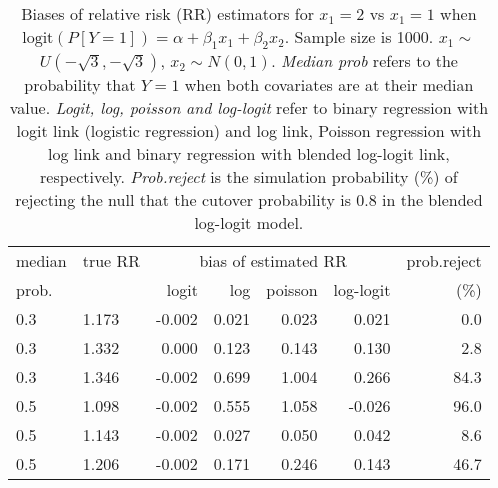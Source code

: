 \documentclass[12pt,a4paper]{article}
\begin{document}
\begin{table}[H] 
\small\sf\centering 
\caption{Biases of relative risk (RR) estimators for $x_1=2$ vs $x_1=1$ when $\mbox{logit}(P[Y=1])=\alpha+\beta_1 x_1 + \beta_2 x_2$. Sample size is 1000. $x_1 \sim $$U(-\sqrt{3},-\sqrt{3})$, $x_2 \sim N(0,1)$. {\it Median prob} refers to the probability that $Y=1$ when both covariates are at their median value. {\it Logit, log, poisson and log-logit} refer to binary regression with logit link (logistic regression) and log link, Poisson regression with log link and binary regression with blended log-logit link, respectively. {\it Prob.reject} is the simulation probability (\%) of rejecting the null that the cutover probability is $0.8$ in the blended log-logit model.} 
\begin{tabular}{llrrrrr} 
\toprule 
median & true RR & \multicolumn{4}{c}{bias of estimated RR} & prob.reject \\ 
prob. & & logit & log & poisson & log-logit  & (\%) \\ \midrule 
0.3 & 1.173 & -0.002 & 0.021 & 0.023 &  0.021 &  0.0 \\  
0.3 & 1.332 &  0.000 & 0.123 & 0.143 &  0.130 &  2.8 \\  
0.3 & 1.346 & -0.002 & 0.699 & 1.004 &  0.266 & 84.3 \\  
0.5 & 1.098 & -0.002 & 0.555 & 1.058 & -0.026 & 96.0 \\  
0.5 & 1.143 & -0.002 & 0.027 & 0.050 &  0.042 &  8.6 \\  
0.5 & 1.206 & -0.002 & 0.171 & 0.246 &  0.143 & 46.7 \\  
\bottomrule 
\end{tabular} 
\end{table} 
\end{document}
